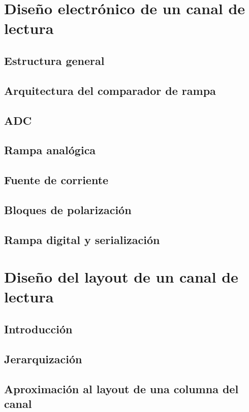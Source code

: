 \documentclass[12pt,a4paper,oneside,titlepage]{report}
\begin{document}
\chapter{Diseño electrónico de un canal de lectura}

\section{Estructura general}

\section{Arquitectura del comparador de rampa}

\section{ADC}

\section{Rampa analógica}

\section{Fuente de corriente}

\section{Bloques de polarización}

\section{Rampa digital y serialización}

\chapter{Diseño del layout de un canal de lectura}

\section{Introducción}

\section{Jerarquización}

\section{Aproximación al layout de una columna del canal}
\end{document}
